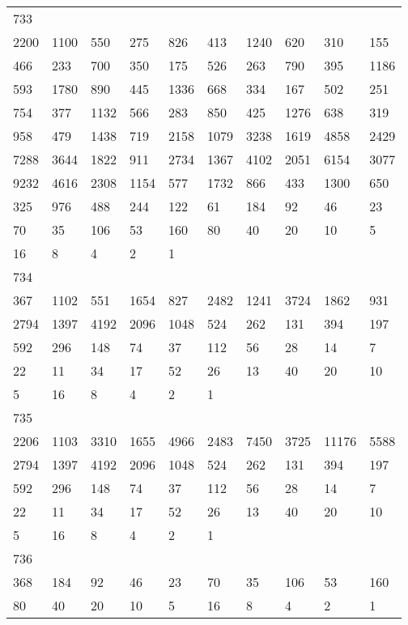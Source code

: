 \begin{longtable}{*{10}{l}}
733&&&&&&&&&\\
2200& 1100& 550& 275& 826& 413& 1240& 620& 310& 155\\
466& 233& 700& 350& 175& 526& 263& 790& 395& 1186\\
593& 1780& 890& 445& 1336& 668& 334& 167& 502& 251\\
754& 377& 1132& 566& 283& 850& 425& 1276& 638& 319\\
958& 479& 1438& 719& 2158& 1079& 3238& 1619& 4858& 2429\\
7288& 3644& 1822& 911& 2734& 1367& 4102& 2051& 6154& 3077\\
9232& 4616& 2308& 1154& 577& 1732& 866& 433& 1300& 650\\
325& 976& 488& 244& 122& 61& 184& 92& 46& 23\\
70& 35& 106& 53& 160& 80& 40& 20& 10& 5\\
16& 8& 4& 2& 1& \\

734&&&&&&&&&\\
367& 1102& 551& 1654& 827& 2482& 1241& 3724& 1862& 931\\
2794& 1397& 4192& 2096& 1048& 524& 262& 131& 394& 197\\
592& 296& 148& 74& 37& 112& 56& 28& 14& 7\\
22& 11& 34& 17& 52& 26& 13& 40& 20& 10\\
5& 16& 8& 4& 2& 1& \\

735&&&&&&&&&\\
2206& 1103& 3310& 1655& 4966& 2483& 7450& 3725& 11176& 5588\\
2794& 1397& 4192& 2096& 1048& 524& 262& 131& 394& 197\\
592& 296& 148& 74& 37& 112& 56& 28& 14& 7\\
22& 11& 34& 17& 52& 26& 13& 40& 20& 10\\
5& 16& 8& 4& 2& 1& \\

736&&&&&&&&&\\
368& 184& 92& 46& 23& 70& 35& 106& 53& 160\\
80& 40& 20& 10& 5& 16& 8& 4& 2& 1\\


\end{longtable}
